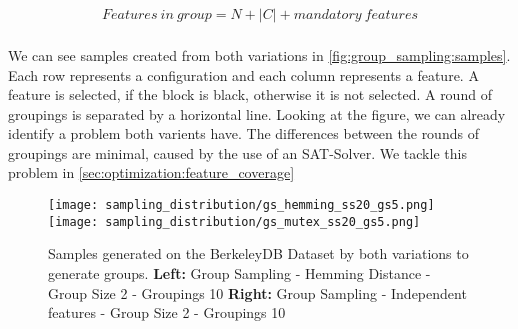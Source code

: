 \documentclass[../../thesis.tex]{subfiles}
\begin{document}
\begin{equation} \label{eq:group_sampling:creation_of_groups:hamming:mutex}
    Features\ in\ group = N + |C| + mandatory\ features
\end{equation}



\subsubsection{}
We can see samples created from both variations in \autoref{fig:group_sampling:samples}.
Each row represents a configuration and each column represents a feature. A feature is selected,
if the block is black, otherwise it is not selected. A round of groupings is separated by
a horizontal line.
Looking at the figure, we can already identify a problem both varients have.
The differences between the rounds of groupings are minimal, caused by the use of an SAT-Solver.
We tackle this problem in \autoref{sec:optimization:feature_coverage}


\begin{figure}[htp]
    \begin{center}

        \texttt{[image: sampling\_distribution/gs\_hemming\_ss20\_gs5.png]}
        \texttt{[image: sampling\_distribution/gs\_mutex\_ss20\_gs5.png]}
    \end{center}

    \caption[Group Sampling - Samples]{
        Samples generated on the BerkeleyDB Dataset by both variations to generate groups.
        \textbf{Left:}  Group Sampling - Hemming Distance - Group Size 2 - Groupings 10
        \textbf{Right:} Group Sampling - Independent features - Group Size 2 - Groupings 10
    }\label{fig:group_sampling:samples}
\end{figure}
\end{document}

